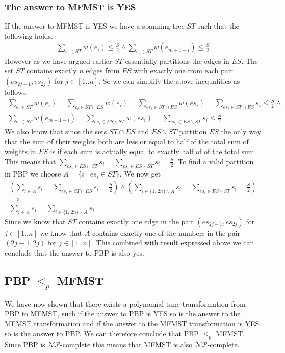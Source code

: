 \subsubsection*{The answer to MFMST is YES}
If the answer to MFMST is YES we have a spanning tree $ST$ such that the following holds.
\begin{gather*}
    \sum_{e_i\in ST}w(e_i) \leq \frac{S}{2} \land \sum_{e_i\in ST} w(e_{m+1-i}) \leq \frac{S}{2}
\end{gather*}
However as we have argued earlier $ST$ essentially partitions the edges in $ES$. The set $ST$ contains exactly $n$ edges from $ES$ with exactly one from each pair $(es_{2j-1},es_{2j})$ for $j\in [1..n]$. So we can simplify the above inequalities as follows.
\begin{gather*}
    \sum_{e_i\in ST}w(e_i) = \sum_{e_i \in ST\cap ES} w(e_i) = \sum_{es_i \in ST\cap ES} w(es_i) = \sum_{es_i \in ST\cap ES} s_i \leq \frac{S}{2} \land \\
    \sum_{e_i\in ST} w(e_{m+1-i}) = \sum_{es_i\in ES \backslash ST} w(es_i) = \sum_{es_i\in ES \backslash ST} s_i \leq \frac{S}{2} 
\end{gather*}
We also know that since the sets $ST \cap ES$ and $ES \backslash ST$ partition $ES$ the only way that the sum of their weights both are less or equal to half of the total sum of weights in $ES$ is if each sum is actually equal to exactly half of of the total sum. This means that $\sum_{es_i \in ES\cap ST} s_i = \sum_{es_i\in ES \backslash ST} s_i = \frac{S}{2}$. To find a valid partition in PBP we choose  $A=\{i\mid es_{i} \in ST\}$. We now get
\begin{gather*}
    \left(\sum_{i\in A} s_i = \sum_{es_i\in ST \cap ES} s_i = \frac{S}{2}\right) \land
    \left(\sum_{i\in \{1..2n\}\backslash A} s_i = \sum_{es_i \in ES \backslash ST} s_i = \frac{S}{2}\right) \\ \implies\\
    \sum_{i\in A} s_i = \sum_{i\in \{1..2n\}\backslash A} s_i 
\end{gather*}
Since we know that $ST$ contains exactly one edge in the pair $(es_{2j-1},es_{2j})$ for $j\in[1..n]$ we know that $A$ contains exactly one of the numbers in the pair $(2j-1,2j)$ for $j \in [1..n]$. This combined with result expressed above we can conclude that the answer to PBP is also yes.

\subsection*{PBP $\leq_p$ MFMST}
We have now shown that there exists a polynomial time transformation from PBP to MFMST, such if the answer to PBP is YES so is the answer to the MFMST transformation and if the answer to the MFMST transformation is YES so is the answer to PBP. We can therefore conclude that PBP $\leq_p$ MFMST. Since PBP is $\mathcal{NP}$-complete this means that MFMST is also $\mathcal{NP}$-complete.